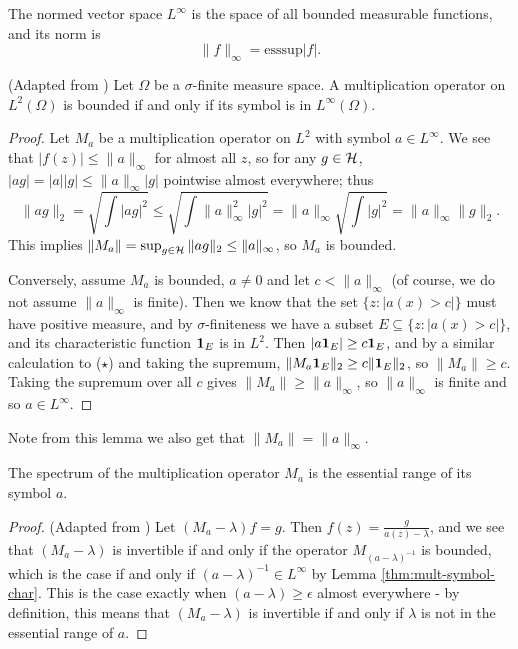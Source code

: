 \documentclass[../main.tex]{subfiles}
\begin{document}
The normed vector space $L^\infty$ is the space of all bounded measurable
functions, and its norm is
 $$\|f\|_\infty = \text{esssup}|f|.$$

\begin{lemma}
\label{thm:mult-symbol-char}
(Adapted from \cite{arveson2002short})
  Let $\Omega$ be a $\sigma$-finite measure space.
  A multiplication operator on $L^2(\Omega)$ is bounded if and only if its symbol is in
  $L^\infty(\Omega)$.
\end{lemma}
\begin{proof}
Let $M_a$ be a multiplication operator on $L^2$ with symbol
$a \in L^\infty$. We see that $|f(z)| \leq \|a\|_\infty$ for almost all
$z$, so for any $g \in \mathcal{H}$, $|a g| = |a||g| \leq \|a\|_\infty |g|$
pointwise almost everywhere; thus
\begin{equation*}
\|a g\|_2 = \sqrt{\int |a g|^2} \leq \sqrt{\int \|a\|_\infty^2|g|^2} 
	  = \|a\|_\infty \sqrt{\int |g|^2} = \|a\|_\infty \|g\|_2.
\tag{$\star$}
\end{equation*}
This implies $\|M_a\| = \sup_{g \in \mathcal{H}} \|a g\|_2 \leq \|a\|_\infty$, so $M_a$ is bounded.

Conversely, assume $M_a$ is bounded, $a \neq 0$ and let $c < \|a\|_\infty$ (of
course, we do not assume $\|a\|_\infty$ is finite). Then we know that
the set $\{z : |a(x) > c|\}$ must have positive measure, and by
$\sigma$-finiteness we have a subset $E \subseteq \{z : |a(x) > c|\}$,
and its characteristic 
function $\mathbf{1}_E$ is in $L^2$. Then $|a \mathbf{1}_E| \geq c \mathbf{1}_E$, and by a similar
calculation to ($\star$) and taking the supremum, $\|M_a  \mathbf{1}_E\|_2 \geq c
\|\mathbf{1}_E\|_2$, so $\|M_a\| \geq c$. Taking the supremum over all $c$ gives
$\|M_a\| \geq \|a\|_\infty$, so $\|a\|_\infty$ is finite and so $a \in
L^\infty$. \end{proof}

Note from this lemma we also get that $\|M_a\| = \|a\|_\infty$.

\begin{theorem}
  \label{thm:mult-op-spec}
  The spectrum of the multiplication operator $M_a$ is the essential range of its symbol $a$.
\end{theorem}
\begin{proof}
(Adapted from \cite{garcia2023operator})
Let $(M_a - \lambda)f = g$. Then $f(z) = \frac{g}{a(z) - \lambda}$, and we see
that $(M_a - \lambda)$ is invertible if and only if the operator 
$M_{(a - \lambda)^{-1}}$ is bounded, which is the case if and only if
$(a - \lambda)^{-1} \in L^\infty$ by Lemma \ref{thm:mult-symbol-char}.
This is the case exactly when $(a - \lambda) \geq \epsilon$ almost everywhere -
by definition, this means that $(M_a - \lambda)$ is invertible if and
only if $\lambda$ is not in the essential range of $a$.
\end{proof}
\end{document}
